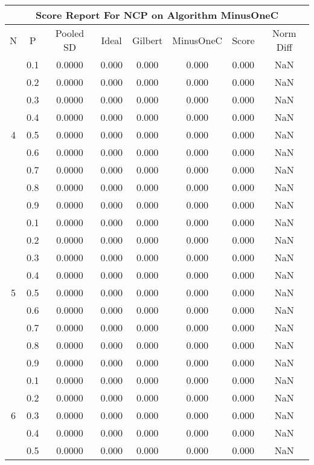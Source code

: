 \documentclass[11pt,a4paper]{report}
\begin{document}
\begin{longtable}{ | c | c || c | c | c | c | c | c | }
\hline
\multicolumn{8}{|c|}{ Score Report For NCP on Algorithm MinusOneC} \\
\hline
N & P & Pooled SD &  Ideal &  Gilbert & MinusOneC  & Score & Norm Diff \\
 \hline
 \hline
 \endhead
\multirow{9}{*}{4} & 0.1 & 0.0000 & 0.000 & 0.000 & 0.000 & 0.000 & NaN \\
 & 0.2 & 0.0000 & 0.000 & 0.000 & 0.000 & 0.000 & NaN \\
 & 0.3 & 0.0000 & 0.000 & 0.000 & 0.000 & 0.000 & NaN \\
 & 0.4 & 0.0000 & 0.000 & 0.000 & 0.000 & 0.000 & NaN \\
 & 0.5 & 0.0000 & 0.000 & 0.000 & 0.000 & 0.000 & NaN \\
 & 0.6 & 0.0000 & 0.000 & 0.000 & 0.000 & 0.000 & NaN \\
 & 0.7 & 0.0000 & 0.000 & 0.000 & 0.000 & 0.000 & NaN \\
 & 0.8 & 0.0000 & 0.000 & 0.000 & 0.000 & 0.000 & NaN \\
 & 0.9 & 0.0000 & 0.000 & 0.000 & 0.000 & 0.000 & NaN \\
 \hline
\multirow{9}{*}{5} & 0.1 & 0.0000 & 0.000 & 0.000 & 0.000 & 0.000 & NaN \\
 & 0.2 & 0.0000 & 0.000 & 0.000 & 0.000 & 0.000 & NaN \\
 & 0.3 & 0.0000 & 0.000 & 0.000 & 0.000 & 0.000 & NaN \\
 & 0.4 & 0.0000 & 0.000 & 0.000 & 0.000 & 0.000 & NaN \\
 & 0.5 & 0.0000 & 0.000 & 0.000 & 0.000 & 0.000 & NaN \\
 & 0.6 & 0.0000 & 0.000 & 0.000 & 0.000 & 0.000 & NaN \\
 & 0.7 & 0.0000 & 0.000 & 0.000 & 0.000 & 0.000 & NaN \\
 & 0.8 & 0.0000 & 0.000 & 0.000 & 0.000 & 0.000 & NaN \\
 & 0.9 & 0.0000 & 0.000 & 0.000 & 0.000 & 0.000 & NaN \\
 \hline
\multirow{9}{*}{6} & 0.1 & 0.0000 & 0.000 & 0.000 & 0.000 & 0.000 & NaN \\
 & 0.2 & 0.0000 & 0.000 & 0.000 & 0.000 & 0.000 & NaN \\
 & 0.3 & 0.0000 & 0.000 & 0.000 & 0.000 & 0.000 & NaN \\
 & 0.4 & 0.0000 & 0.000 & 0.000 & 0.000 & 0.000 & NaN \\
 & 0.5 & 0.0000 & 0.000 & 0.000 & 0.000 & 0.000 & NaN \\

\end{longtable}
\end{document}
